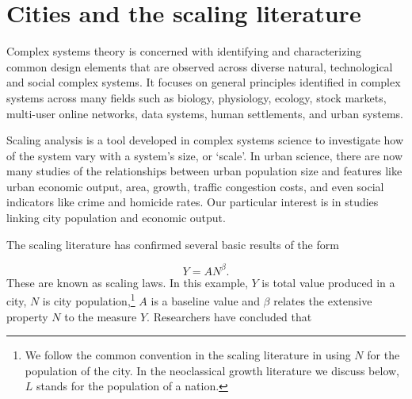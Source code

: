 \section{Cities and the scaling literature}

Complex systems theory is concerned with identifying and characterizing common design elements that are observed across diverse natural, technological and social complex systems. It focuses on general principles  identified in complex systems across many fields such as biology, physiology, ecology, stock markets, multi-user online  networks, data systems, human settlements, and urban systems.

Scaling analysis is a tool developed in complex systems science to investigate how  of the system vary with a system's size,  or `scale'.  In urban science, there are now many studies of  the relationships between urban population size and  features like urban economic output,  area, growth, traffic congestion costs, and even social  indicators like crime and homicide rates. Our particular interest is in studies linking city population  and  economic output. 

The scaling literature has confirmed several basic results of the form 

\begin{equation}
Y=AN^\beta.
\end{equation} 
These are known as \glspl{scaling law}. In this example, $Y$ is total value produced in a city, $N$ is city population,\footnote{We follow the common convention in the scaling literature  in using $N$ for the population of the city. In the neoclassical growth literature we discuss below, $L$ stands for the population of a nation.} $A$ is a baseline value and $\beta$ relates the \gls{extensive property} $N$ to the measure $Y$. Researchers have concluded that 

